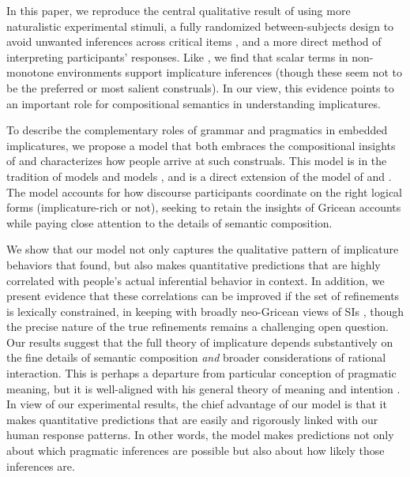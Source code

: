 \documentclass[leqno,12pt]{article}
\begin{document}
In this paper, we reproduce the central qualitative result of
\citet{Chemla:Spector:2011} using more naturalistic experimental
stimuli, a fully randomized between-subjects design to avoid unwanted
inferences across critical items \citep{geurts-vantiel:2013:scalar},
and a more direct method of interpreting participants' responses. Like
\citeauthor{Chemla:Spector:2011}, we find that scalar terms in
non-monotone environments support implicature inferences (though these
seem not to be the preferred or most salient construals).  In our
view, this evidence points to an important role for compositional
semantics in understanding implicatures.

To describe the complementary roles of grammar and pragmatics in
embedded implicatures, we propose a model that both embraces the
compositional insights of \citeauthor{ChierchiaFoxSpector08} and
characterizes how people arrive at such construals. This model is in
the tradition of  models
\citep{Frank:Goodman:2012,Goodman:Stuhlmuller:2013} and  models \citep{Franke09DISS,Jaeger:2011}, and is a
direct extension of the  model
of \citet{Bergen:Goodman:Levy:2012} and
\citet{Bergen:Levy:Goodman:2014}. The model accounts for how discourse
participants coordinate on the right logical forms (implicature-rich
or not), seeking to retain the insights of Gricean accounts while
paying close attention to the details of semantic composition.

We show that our model not only captures the qualitative pattern of
implicature behaviors that \citeauthor{Chemla:Spector:2011} found, but
also makes quantitative predictions that are highly correlated with
people's actual inferential behavior in context. In addition, we
present evidence that these correlations can be improved if the set of
refinements is lexically constrained, in keeping with broadly
neo-Gricean views of SIs
\citep{Horn72,Gazdar79b,Gazdar79a,SchulzVanRooij06}, though the
precise nature of the true refinements remains a challenging open
question.  Our results suggest that the full theory of implicature
depends substantively on the fine details of semantic composition
\emph{and} broader considerations of rational interaction. This is
perhaps a departure from  particular conception of
pragmatic meaning, but it is well-aligned with his general theory of
meaning and intention \citep{Grice68,Grice89,sep-grice}. In view of
our experimental results, the chief advantage of our model is that it
makes quantitative predictions that are easily and rigorously linked
with our human response patterns. In other words, the model makes
predictions not only about which pragmatic inferences are possible but
also about how likely those inferences are.
\end{document}
